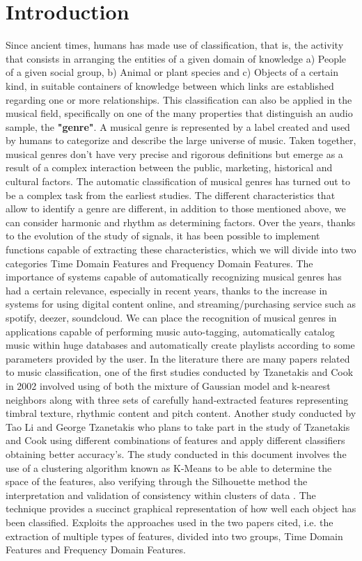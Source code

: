 \documentclass[conference]{IEEEtran}
\begin{document}
\section{Introduction}
\noindent
Since ancient times, humans has made use of classification, that is, the activity that consists in arranging the entities of a given domain of knowledge a) People of a given social group, b) Animal or plant species and c) Objects of a certain kind, in suitable containers of knowledge between which links are established regarding one or more relationships. This classification can also be applied in the musical field, specifically on one of the many properties that distinguish an audio sample, the \textbf{"genre"}\cite{Genre}. A musical genre is represented by a label created and used by humans to categorize and describe the large universe of music. Taken together, musical genres don't have very precise and rigorous definitions but emerge as a result of a complex interaction between the public, marketing, historical and cultural factors.
The automatic classification of musical genres has turned out to be a complex task from the earliest studies. The different characteristics that allow to identify a genre are different, in addition to those mentioned above, we can consider harmonic and rhythm as determining factors. Over the years, thanks to the evolution of the study of signals, it has been possible to implement functions capable of extracting these characteristics, which we will divide into two categories Time Domain Features and Frequency Domain Features. The importance of systems capable of automatically recognizing musical genres has had a certain relevance, especially in recent years, thanks to the increase in systems for using digital content online, and streaming/purchasing service such as spotify, deezer, soundcloud. We can place the recognition of musical genres in applications capable of performing music auto-tagging, automatically catalog music within huge databases and automatically create playlists according to some parameters provided by the user. In the literature there are many papers related to music classification, one of the first studies conducted by Tzanetakis and Cook in 2002 \cite{1021072} involved using of both the mixture of Gaussian model and k-nearest neighbors along with three sets of carefully hand-extracted features representing timbral texture, rhythmic content and pitch content. Another study conducted by Tao Li and George Tzanetakis \cite{1285840} who plans to take part in the study of Tzanetakis and Cook using different combinations of features and apply different classifiers obtaining better accuracy's. The study conducted in this document involves the use of a clustering algorithm known as K-Means to be able to determine the space of the features, also verifying through the Silhouette method the interpretation and validation of consistency within clusters of data \cite{ROUSSEEUW198753}. The technique provides a succinct graphical representation of how well each object has been classified. Exploits the approaches used in the two papers cited, i.e. the extraction of multiple types of features, divided into two groups, Time Domain Features and Frequency Domain Features.
\end{document}

